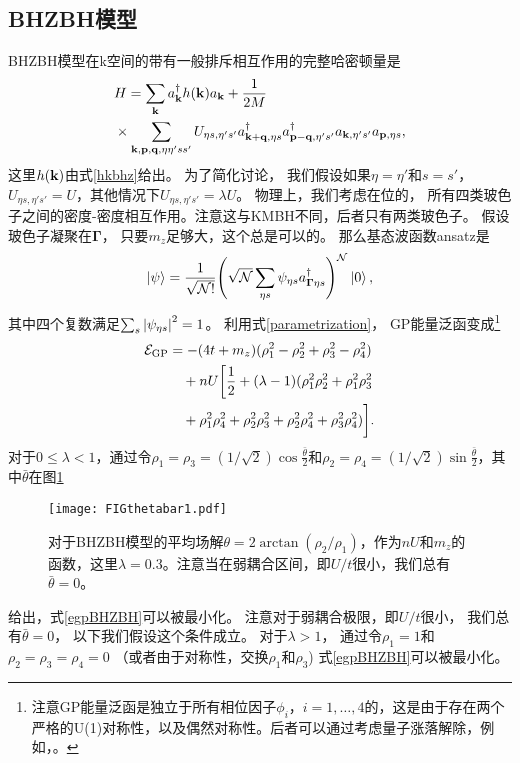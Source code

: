 \subsection{BHZBH模型}
BHZBH模型在k空间的带有一般排斥相互作用的完整哈密顿量是
\begin{equation}\label{BHZBHfullh}
\begin{split}
	&H = \sum_{\vb k}a^\dagger_{\vb k}h(\vb k)a_{\vb k} + \frac{1}{2M}\\
	&\times \sum_{\vb k,\vb p,\vb q,\eta\eta' s s'} U_{\eta s,\eta's'}a^\dagger_{\vb k+\vb q,\eta s}a^\dagger_{\vb p-\vb q,\eta' s'}a_{\vb k,\eta' s'}a_{\vb p,\eta s},
\end{split}
\end{equation}
这里$h(\vb k)$由式\eqref{hkbhz}给出。
为了简化讨论，
我们假设如果$\eta=\eta'$和$s=s'$，$U_{\eta s,\eta' s'}=U$，其他情况下$U_{\eta s,\eta' s'}=\lambda U$。
物理上，我们考虑在位的，
所有四类玻色子之间的密度-密度相互作用。注意这与KMBH不同，后者只有两类玻色子。
假设玻色子凝聚在$\boldsymbol{\Gamma}$，
只要$m_z$足够大，这个总是可以的。
那么基态波函数ansatz是
\begin{equation}
	\ket{\psi}=\frac{1}{\sqrt{\mathcal N!}}\pqty{\sqrt{\mathcal N}\sum_{\eta s}\psi_{\eta s}a_{\boldsymbol{\Gamma}\eta s}^\dagger}^{\mathcal N}\ket{0},\nonumber
\end{equation}
其中四个复数满足$\sum_{s}\abs{\psi_{\eta s}}^2=1$。
利用式\eqref{parametrization}，
GP能量泛函变成\footnote{注意GP能量泛函是独立于所有相位因子$\phi_i$，$i=1,\dots,4$的，这是由于存在两个严格的U(1)对称性，以及偶然对称性。后者可以通过考虑量子涨落解除，例如，\cite{You2012}。}
\begin{equation}\label{egpBHZBH}
	\begin{split}
		\mathcal E_{\textnormal{GP}} &= -(4t+m_z)(\rho_1^2-\rho_2^2+\rho_3^2-\rho_4^2)\\
		&\quad + nU\bigg[\frac{1}{2}+(\lambda-1) (\rho_1^2\rho_2^2 +\rho_1^2\rho_3^2\\
		&\quad + \rho_1^2\rho_4^2 + \rho_2^2\rho_3^2 +\rho_2^2\rho_4^2 + \rho_3^2\rho_4^2)\bigg].
	\end{split}
\end{equation}
对于$0\leq\lambda<1$，通过令$\rho_1=\rho_3=(1/\sqrt{2})\cos\frac{\bar\theta}{2}$和$\rho_2=\rho_4=(1/\sqrt{2})\sin\frac{\bar\theta}{2}$，其中$\bar\theta$在图\ref{BHZBHtheta}%
\begin{figure}
	\texttt{[image: FIGthetabar1.pdf]}
	\caption{对于BHZBH模型的平均场解$\theta=2\arctan(\rho_2/\rho_1)$，作为$nU$和$m_z$的函数，这里$\lambda=0.3$。注意当在弱耦合区间，即$U/t$很小，我们总有$\bar\theta=0$。}
	\label{BHZBHtheta}
\end{figure}
给出，式\eqref{egpBHZBH}可以被最小化。
注意对于弱耦合极限，即$U/t$很小，
我们总有$\bar\theta=0$，
以下我们假设这个条件成立。
对于$\lambda>1$，
通过令$\rho_1=1$和$\rho_2=\rho_3=\rho_4=0$
（或者由于对称性，交换$\rho_1$和$\rho_3$)
式\eqref{egpBHZBH}可以被最小化。

